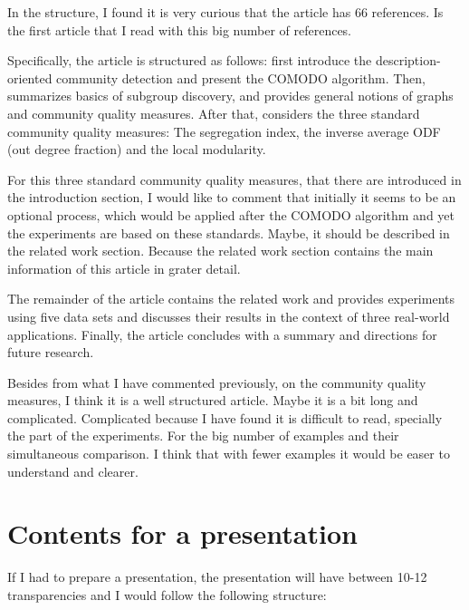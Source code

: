 \documentclass[a4paper]{article}
\begin{document}
In the structure, I found it is very curious that the article has 66 references. Is the first article that I read with this big number of references.
\vskip 0.35cm

Specifically, the article is structured as follows: first introduce the description-oriented community detection and present the COMODO algorithm. Then, summarizes basics of subgroup discovery, and provides general notions of graphs and community quality measures. After that, considers the three standard community quality measures: The segregation index, the inverse average ODF (out degree fraction) and the local modularity.
\vskip 0.35cm

For this three standard community quality measures, that there are introduced in the introduction section, I would like to comment that initially it seems to be an optional process, which would be applied after the COMODO algorithm and yet the experiments are based on these standards. Maybe, it should be described in the related work section. Because the related work section contains the main information of this article in grater detail.
\vskip 0.35cm

The remainder of the article contains the related work and provides experiments using five data sets and discusses their results in the context of three real-world applications. Finally, the article concludes with a summary and directions for future research.
\vskip 0.35cm

Besides from what I have commented previously, on the community quality measures, I think it is a well structured article. Maybe it is a bit long and complicated. Complicated because I have found it is difficult to read, specially the part of the experiments. For the big number of examples and their simultaneous comparison. I think that with fewer examples it would be easer to understand and clearer.

\section*{Contents for a presentation}
If I had to prepare a presentation, the presentation will have between 10-12 transparencies and I would follow the following structure:
\end{document}
